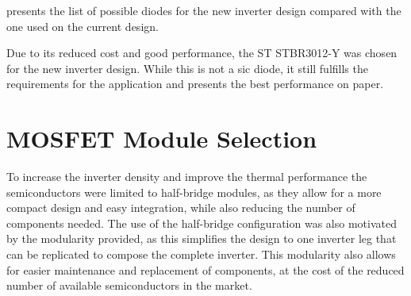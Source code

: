  presents the list of possible diodes for the new inverter design compared with the one used on the current design.
\begin{table}[H]
	\centering
	\caption{List of possible diodes for the new inverter design compared to the solution used on the current design.}
	\label{tab:diode_list}
\end{table}

Due to its reduced cost and good performance, the ST STBR3012-Y was chosen for the new inverter design. While this is not a \gls{sic} diode, it still fulfills the requirements for the application and presents the best performance on paper.

\section{MOSFET Module Selection}


To increase the inverter density and improve the thermal performance the semiconductors were limited to half-bridge modules, as they allow for a more compact design and easy integration, while also reducing the number of components needed. The use of the half-bridge configuration was also motivated by the modularity provided, as this simplifies the design to one inverter leg that can be replicated to compose the complete inverter. This modularity also allows for easier maintenance and replacement of components, at the cost of the reduced number of available semiconductors in the market.

